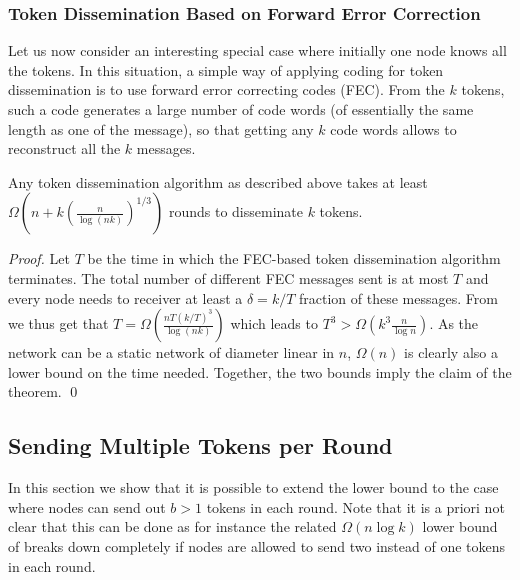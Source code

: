 \documentclass{llncs}
\begin{document}
\subsubsection*{Token Dissemination Based on Forward Error Correction}

Let us now consider an interesting special case where initially one
node knows all the tokens. In this situation, a simple way of applying
coding for token dissemination is to use forward error correcting
codes (FEC). From the $k$ tokens, such a code generates a large number
of code words (of essentially the same length as one of the message),
so that getting any $k$ code words allows to reconstruct all the $k$
messages.

\begin{theorem}
    Any token dissemination algorithm as described above takes at
    least $\Omega(n + k (\frac{n}{\log (nk)})^{1/3})$ rounds to
    disseminate $k$ tokens.
\end{theorem}
\begin{proof}
    Let $T$ be the time in which the FEC-based token dissemination
    algorithm terminates. The total number of different FEC messages
    sent is at most $T$ and every node needs to receiver at least a
    $\delta = k / T$ fraction of these messages. From
     we thus get that $T = \Omega(\frac{nT
        (k/T)^3}{\log (nk)})$ which leads to $T^3 > \Omega(k^3
    \frac{n}{\log n})$. As the network can be a static network of
    diameter linear in $n$, $\Omega(n)$ is clearly also a lower bound
    on the time needed. Together, the two bounds imply the claim of
    the theorem.
\hspace*{\fill}\qed\end{proof}


\subsection{Sending Multiple Tokens per Round}
\label{sec:multipletokens}

In this section we show that it is possible to extend the lower bound
to the case where nodes can send out $b>1$ tokens in each round. Note
that it is a priori not clear that this can be done as for instance
the related $\Omega(n\log k)$ lower bound of \cite{KLO} breaks down
completely if nodes are allowed to send two instead of one tokens in
each round.
\end{document}
